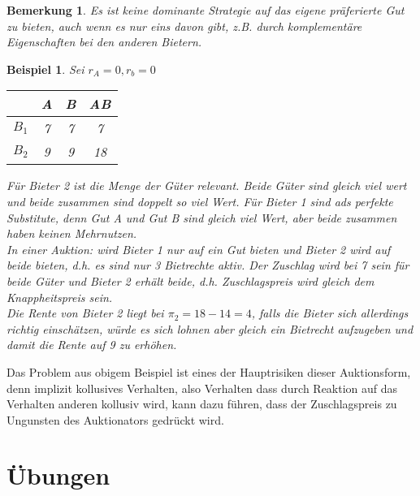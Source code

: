 \documentclass[12pt]{extreport} %
\theoremstyle{named}
\theoremstyle{nnamed}
\theoremstyle{itshape}
\theoremstyle{normal}
\newtheorem{beispiel}[unnamedtheorem]{Beispiel}
\newtheorem*{bemerkung}{Bemerkung}
\begin{document}
\begin{bemerkung}
	Es ist keine dominante Strategie auf das eigene präferierte Gut zu bieten, auch wenn es nur eins davon gibt, z.B. durch komplementäre Eigenschaften bei den anderen Bietern.	
\end{bemerkung}

\begin{beispiel}
	Sei $r_A = 0, r_b = 0$
	\begin{figure*}[h!] \centering
		\begin{tabular}{l|ccc}
			& A & B & AB \\
  				\hline
  			$B_1$ & 7 & 7 & 7  \\
  			$B_2$ & 9 & 9 & 18  
		\end{tabular}
	\end{figure*}
	Für Bieter 2 ist die Menge der Güter relevant. Beide Güter sind gleich viel wert und beide zusammen sind doppelt so viel Wert. Für Bieter 1 sind ads perfekte Substitute, denn Gut A und Gut B sind gleich viel Wert, aber beide zusammen haben keinen Mehrnutzen. ~\\
	
	In einer Auktion: wird Bieter 1 nur auf ein Gut bieten und Bieter 2 wird auf beide bieten, d.h. es sind nur 3 Bietrechte aktiv. Der Zuschlag wird bei 7 sein für beide Güter und Bieter 2 erhält beide, d.h. Zuschlagspreis wird gleich dem Knappheitspreis sein.~\\
	
	Die Rente von Bieter 2 liegt bei $\pi_2 = 18- 14 = 4$, falls die Bieter sich allerdings richtig einschätzen, würde es sich lohnen aber gleich ein Bietrecht aufzugeben und damit die Rente auf 9 zu erhöhen.
\end{beispiel}


Das Problem aus obigem Beispiel ist eines der Hauptrisiken dieser Auktionsform, denn implizit kollusives Verhalten, also Verhalten dass durch Reaktion auf das Verhalten anderen kollusiv wird, kann dazu führen, dass der Zuschlagspreis zu Ungunsten des Auktionators gedrückt wird.


\newpage

 \appendix {}  

\chapter*{Übungen}
\end{document}
